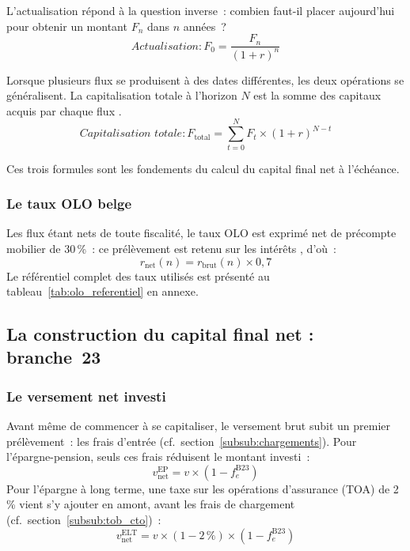 ﻿\documentclass[12pt, a4paper]{article}
\begin{document}
L'actualisation \cite[p.~97--98]{berk2020} répond à la question inverse~: combien faut-il placer aujourd'hui pour obtenir 
un montant $F_n$ dans $n$ années~?
\begin{equation}
  Actualisation : F_0 = \frac{F_n}{(1 + r)^n}
\end{equation}

\bigskip
Lorsque plusieurs flux se produisent à des dates différentes, les deux opérations
se généralisent. La capitalisation totale à l'horizon $N$ est la somme des
capitaux acquis par chaque flux \cite[p.~99]{berk2020}.
\begin{equation}
  \textit{Capitalisation totale} : F_{\text{total}} = \sum_{t=0}^{N} F_t \times (1 + r)^{N-t}
\end{equation}

Ces trois formules sont les fondements du calcul du capital final net à l'échéance.

\subsubsection*{Le taux OLO belge}
\label{sub:taux_olo}

Les flux étant nets de toute fiscalité, le taux OLO est exprimé net de précompte
mobilier de 30\,\%~: ce prélèvement
est retenu sur les intérêts \cite[art.~171]{cir92_2025}, d'où~:
\begin{equation}
  r_{\text{net}}(n) = r_{\text{brut}}(n) \times 0{,}7
\end{equation}
Le référentiel complet des taux utilisés est présenté au
tableau~\ref{tab:olo_referentiel} en annexe.

\subsection{La construction du capital final net : branche~23}

\subsubsection*{Le versement net investi}
\label{sub:versement_net_b23}

Avant même de commencer à se capitaliser, le versement brut subit un premier
prélèvement~: les frais d'entrée (cf.~section~\ref{subsub:chargements}). Pour l'épargne-pension,
seuls ces frais réduisent le montant investi~:
\begin{equation}
  v_{\text{net}}^{\text{EP}} = v \times (1 - f_e^{\text{B23}})
\end{equation}
Pour l'épargne à long terme, une taxe sur les opérations d'assurance (TOA)
de 2\,\% vient s'y ajouter en amont, avant les frais de chargement (cf.~section~\ref{subsub:tob_cto})~:
\begin{equation}
  v_{\text{net}}^{\text{ELT}} = v \times (1 - 2\,\%) \times (1 - f_e^{\text{B23}})
\end{equation}
\end{document}
